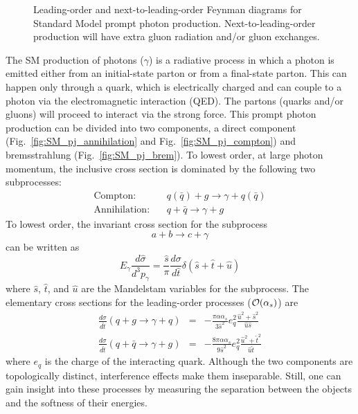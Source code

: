 \begin{figure}[p]
\begin{center}
{\begin{tabular}{cc}
\end{tabular}
}
\end{center}
\caption{Leading-order and next-to-leading-order Feynman diagrams for Standard Model prompt photon production. Next-to-leading-order production will have extra gluon radiation and/or gluon exchanges.}
\label{fig:SM_pj_Feynmans}
\end{figure}

The SM production of photons ($\gamma$) is a radiative process in which a photon is emitted either from an initial-state parton or from a final-state parton. This can happen only through a quark, which is electrically charged and can couple to a photon via the electromagnetic interaction (QED). The partons (quarks and/or gluons) will proceed to interact via the strong force. This prompt photon production can be divided into two components, a direct component (Fig.~\ref{fig:SM_pj_annihilation} and Fig.~\ref{fig:SM_pj_compton}) and bremsstrahlung (Fig.~\ref{fig:SM_pj_brem}). To lowest order, at large photon momentum, the inclusive cross section is dominated by the following two subprocesses:
\begin{eqnarray}
\mathrm{Compton:} && q(\bar{q}) + g \to \gamma + q(\bar{q})\\
\mathrm{Annihilation:} && q + \bar{q} \to \gamma + g
\label{eqa:gjets_ComptAnnihilation}
\end{eqnarray}
To lowest order, the invariant cross section for the subprocess
\begin{equation}
 a+b\to c+\gamma
\end{equation}
can be written as
\begin{equation}
 E_{\gamma}\frac{d\hat{\sigma}}{d^{3}p_{\gamma}} = \frac{\hat{s}}{\pi}\frac{d\sigma}{d\hat{t}}\delta(\hat{s}+\hat{t}+\hat{u})
\end{equation}
where $\hat{s}$, $\hat{t}$, and $\hat{u}$ are the Mandelstam variables \cite{pap:JFOwens_RevModPhy59465_1987} for the subprocess. The elementary cross sections for the leading-order processes (${\cal O}(\alpha_{s})$) are
\begin{eqnarray}
 \frac{d\sigma}{d\hat{t}} (q + g \to \gamma + q) &=& -\frac{\pi\alpha\alpha_{s}}{3{\hat s}^{2}} e^{2}_{q} \frac{{\hat u}^{2}+{\hat s}^2}{{\hat u}{\hat s}}\\
 \frac{d\sigma}{d\hat{t}}(q + \bar{q} \to \gamma + g) &=& -\frac{8\pi\alpha\alpha_{s}}{9{\hat s}^{2}} e^{2}_{q} \frac{{\hat u}^{2}+{\hat t}^2}{{\hat u}{\hat t}}
\end{eqnarray}
where $e_{q}$ is the charge of the interacting quark. Although the two components are topologically distinct, interference effects make them inseparable. Still, one can gain insight into these processes by measuring the separation between the objects and the softness of their energies.

